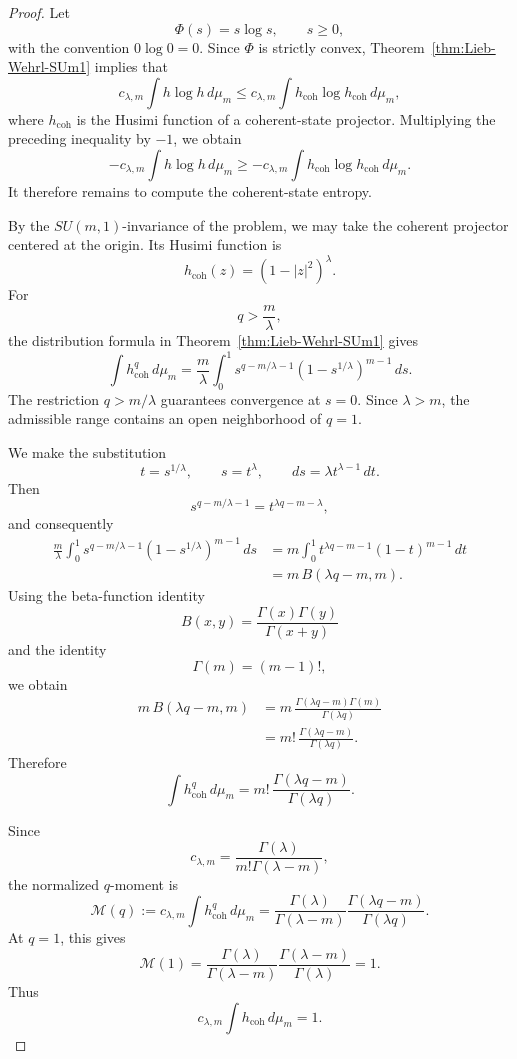 \documentclass[11pt,reqno]{amsart}
\numberwithin{equation}{section}
\theoremstyle{definition}
\theoremstyle{remark}
\begin{document}
\begin{proof}
Let
\[
\Phi(s)=s\log s,\qquad s\geq 0,
\]
with the convention \(0\log 0=0\). Since \(\Phi\) is strictly convex,
Theorem~\ref{thm:Lieb-Wehrl-SUm1} implies that
\[
c_{\lambda,m}\int h\log h\,d\mu_m
\leq
c_{\lambda,m}\int
h_{\mathrm{coh}}\log h_{\mathrm{coh}}\,d\mu_m,
\]
where \(h_{\mathrm{coh}}\) is the Husimi function of a coherent-state
projector. Multiplying the preceding inequality by \(-1\), we obtain
\[
-c_{\lambda,m}\int h\log h\,d\mu_m
\geq
-c_{\lambda,m}\int
h_{\mathrm{coh}}\log h_{\mathrm{coh}}\,d\mu_m.
\]
It therefore remains to compute the coherent-state entropy.

By the \(SU(m,1)\)-invariance of the problem, we may take the coherent
projector centered at the origin. Its Husimi function is
\[
h_{\mathrm{coh}}(z)=(1-|z|^2)^\lambda.
\]
For
\[
q>\frac{m}{\lambda},
\]
the distribution formula in
Theorem~\ref{thm:Lieb-Wehrl-SUm1} gives
\[
\int h_{\mathrm{coh}}^q\,d\mu_m
=
\frac{m}{\lambda}
\int_0^1
s^{q-m/\lambda-1}
\left(1-s^{1/\lambda}\right)^{m-1}\,ds.
\]
The restriction \(q>m/\lambda\) guarantees convergence at \(s=0\).
Since \(\lambda>m\), the admissible range contains an open neighborhood
of \(q=1\).

We make the substitution
\[
t=s^{1/\lambda},
\qquad
s=t^\lambda,
\qquad
ds=\lambda t^{\lambda-1}\,dt.
\]
Then
\[
s^{q-m/\lambda-1}
=
t^{\lambda q-m-\lambda},
\]
and consequently
\[
\begin{aligned}
\frac{m}{\lambda}
\int_0^1
s^{q-m/\lambda-1}
\left(1-s^{1/\lambda}\right)^{m-1}\,ds
&=
m\int_0^1
t^{\lambda q-m-1}(1-t)^{m-1}\,dt \\
&=
m\,B(\lambda q-m,m).
\end{aligned}
\]
Using the beta-function identity
\[
B(x,y)
=
\frac{\Gamma(x)\Gamma(y)}{\Gamma(x+y)}
\]
and the identity
\[
\Gamma(m)=(m-1)!,
\]
we obtain
\[
\begin{aligned}
m\,B(\lambda q-m,m)
&=
m\,
\frac{\Gamma(\lambda q-m)\Gamma(m)}{\Gamma(\lambda q)} \\
&=
m!\,
\frac{\Gamma(\lambda q-m)}{\Gamma(\lambda q)}.
\end{aligned}
\]
Therefore
\[
\int h_{\mathrm{coh}}^q\,d\mu_m
=
m!\,
\frac{\Gamma(\lambda q-m)}{\Gamma(\lambda q)}.
\]

Since
\[
c_{\lambda,m}
=
\frac{\Gamma(\lambda)}{m!\Gamma(\lambda-m)},
\]
the normalized \(q\)-moment is
\[
\mathcal M(q)
:=
c_{\lambda,m}\int h_{\mathrm{coh}}^q\,d\mu_m
=
\frac{\Gamma(\lambda)}{\Gamma(\lambda-m)}
\frac{\Gamma(\lambda q-m)}{\Gamma(\lambda q)}.
\]
At \(q=1\), this gives
\[
\mathcal M(1)
=
\frac{\Gamma(\lambda)}{\Gamma(\lambda-m)}
\frac{\Gamma(\lambda-m)}{\Gamma(\lambda)}
=
1.
\]
Thus
\[
c_{\lambda,m}
\int h_{\mathrm{coh}}\,d\mu_m
=
1.
\]


\end{proof}
\end{document}
